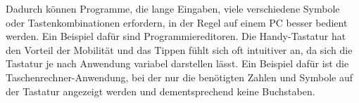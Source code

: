 		Dadurch können Programme, die lange Eingaben, viele verschiedene Symbole oder Tastenkombinationen erfordern, in der Regel auf einem PC besser bedient werden. Ein Beispiel dafür sind Programmiereditoren.\newline
	Die Handy-Tastatur hat den Vorteil der Mobilität und das Tippen fühlt sich oft intuitiver an, da sich die Tastatur je nach Anwendung variabel darstellen lässt. %
		Ein Beispiel dafür ist die Taschenrechner-Anwendung, bei der nur die benötigten Zahlen und Symbole auf der Tastatur angezeigt werden und dementsprechend keine Buchstaben.%


%
%	
%	
%
